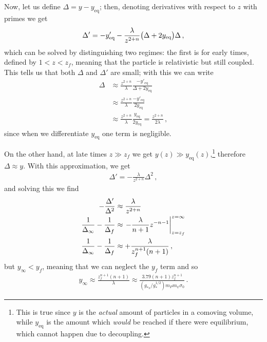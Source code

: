 \documentclass[main.tex]{subfiles}
\begin{document}
Now, let us define \(\Delta = y - y _{\text{eq}} \); then, denoting derivatives with respect to \(z\) with primes we get
%
\begin{align}
\Delta' = - y' _{\text{eq}} - \frac{\lambda}{z^{2+n}} \qty(\Delta + 2 y _{\text{eq}}) \Delta 
\,,
\end{align}
%
which can be solved by distinguishing two regimes: the first is for early times, defined by \(1 < z < z_f\), meaning that the particle is relativistic but still coupled.
This tells us that both \(\Delta \) and \(\Delta '\) are small; with this we can write 
%
\begin{align}
\Delta &\approx \frac{z^{2+n}}{\lambda } \frac{- y' _{\text{eq}}}{\Delta + 2 y _{\text{eq}}}  \\
&\approx \frac{z^{2+n}}{\lambda } \frac{- y' _{\text{eq}}}{2 y _{\text{eq}}}  \\
&\approx \frac{z^{2+n}}{\lambda }
 \frac{y _{\text{eq}}}{2 y _{\text{eq}}} = \frac{z^{2+n}}{2 \lambda }
\,,
\end{align}
%
since when we differentiate \(y _{\text{eq}}\) one term is negligible.

On the other hand, at late times \(z \gg z_f\) we get \(y(z) \gg y _{\text{eq}} (z)\),\footnote{This is true since \(y\) is the \emph{actual} amount of particles in a comoving volume, while \(y _{\text{eq}}\) is the amount which \emph{would} be reached if there were equilibrium, which cannot happen due to decoupling.} therefore \(\Delta \approx y\). 
With this approximation, we get 
%
\begin{align}
\Delta ' = - \frac{\lambda}{z^{2+n}} \Delta^2
\,,
\end{align}
%
and solving this we find 
%
\begin{align}
- \frac{\Delta '}{\Delta^2} &\approx \frac{\lambda }{z^{2 + n}}  \\
\frac{1}{\Delta _\infty } - \frac{1}{\Delta _f} &\approx \eval{- \frac{\lambda}{n+1} z^{-n-1}}_{z = z_f}^{z = \infty } \\
\frac{1}{\Delta_{\infty }} - \frac{1}{\Delta _f} &\approx  + \frac{\lambda }{z_f^{n+1} (n+1) }
\,,
\end{align}
%
but \(y_\infty < y_f\), meaning that we can neglect the \(y_f\) term and so 
%
\begin{align}
y_\infty \approx \frac{z_f^{n+1}(n+1)}{\lambda } \approx
\frac{\num{3.79} (n+1) z_f^{n+1}}{(g_{*s} / g_*^{1/2}) m_P m_\psi \sigma_0 }
\,.
\end{align}
\end{document}
